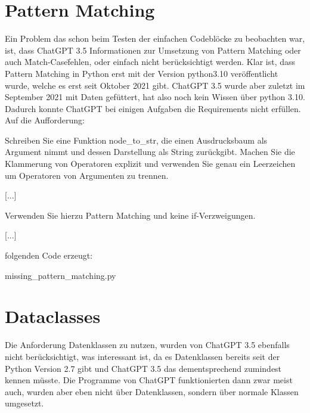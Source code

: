\documentclass[class=scrbook, crop=false]{standalone}
\begin{document}
\section{Pattern Matching}
\label{sec:pattern_matching}
    Ein Problem das schon beim Testen der einfachen Codeblöcke zu beobachten war, ist, dass ChatGPT 3.5 Informationen
    zur Umsetzung von Pattern Matching oder auch \"Match-Case\" fehlen, oder einfach nicht berücksichtigt werden.
    Klar ist, dass Pattern Matching in Python erst mit der Version python3.10 veröffentlicht wurde, welche es erst seit Oktober 2021 gibt.
    ChatGPT 3.5 wurde aber zuletzt im September 2021 mit Daten gefüttert, hat also noch kein Wissen über python 3.10.
    Dadurch konnte ChatGPT bei einigen Aufgaben die Requirements nicht erfüllen.
    Auf die Aufforderung:
    \begin{displayquote}
        Schreiben Sie eine Funktion node\_to\_str, die einen Ausdrucksbaum als Argument nimmt und dessen Darstellung als String
        zurückgibt.
        Machen Sie die Klammerung von Operatoren explizit und verwenden Sie genau ein Leerzeichen um Operatoren
        von Argumenten zu trennen.

        [...]

        Verwenden Sie hierzu Pattern Matching und keine if-Verzweigungen.

        [...]
    \end{displayquote}

    folgenden Code erzeugt:
    
    {missing_pattern_matching.py}


\section{Dataclasses}
\label{sec:dataclasses}
    Die Anforderung Datenklassen zu nutzen, wurden von ChatGPT 3.5 ebenfalls nicht berücksichtigt, was interessant ist,
    da es Datenklassen bereits seit der Python Version 2.7 gibt und ChatGPT 3.5 das dementsprechend zumindest kennen müsste.
    Die Programme von ChatGPT funktionierten dann zwar meist auch, wurden aber eben nicht über Datenklassen, sondern
    über normale Klassen umgesetzt.
\end{document}
